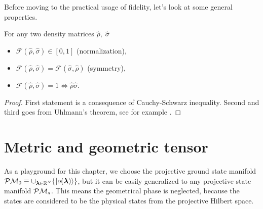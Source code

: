 Before moving to the practical usage of fidelity, let's look at some general properties.
    

\begin{thm}
    For any two density matrices $\hat\rho,\;\hat\sigma$
    \begin{itemize}
        \item $\mathcal F(\hat\rho,\hat\sigma)\in[0,1]$ (normalization),
        \item $\mathcal F(\hat\rho,\hat\sigma) = \mathcal F(\hat\sigma,\hat\rho)$ (symmetry),
        \item $\mathcal F(\hat\rho,\hat\sigma)=1 \Leftrightarrow \hat\rho\hat\sigma$.
    \end{itemize}
\end{thm}
\begin{proof}
    First statement is a consequence of Cauchy-Schwarz inequality. Second and third goes from Uhlmann's theorem, see for example \cite{uhlman}.
\end{proof}



\section{Metric and geometric tensor}
\label{chap:metricTensor}
As a playground for this chapter, we choose the projective ground state manifold $\mathcal{P}\mathcal{M}_0\equiv \cup_{{\bm\lambda}\in\mathbb{R}^N} \{\ket{o({\bm\lambda})}\}$, but it can be easily generalized to any projective state manifold $\mathcal{P}\mathcal{M}_s$. This means the geometrical phase is neglected, because the states are considered to be the physical states from the projective Hilbert space.

